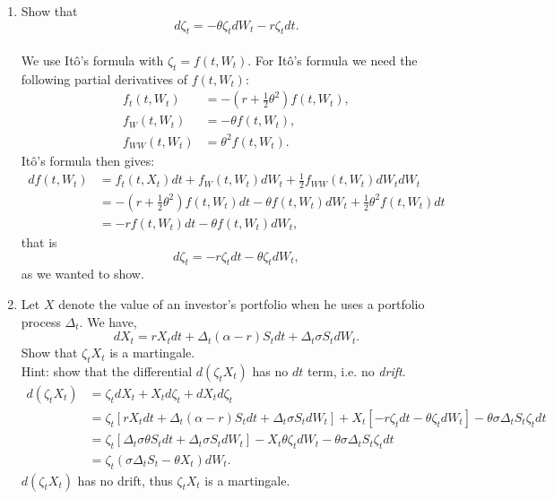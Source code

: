 \documentclass[11pt,a4,table]{article}
\begin{document}
\begin{enumerate}
    \begin{enumerate}
        \item Show that
        \begin{equation*}
            d\zeta_t = -\theta \zeta_t dW_t - r\zeta_t dt.
        \end{equation*}\\
        We use Itô's formula with $\zeta_t=f(t,W_t)$. For Itô's formula we need the following partial derivatives of $f(t,W_t)$:
        \begin{align*}
            f_t(t,W_t) &= -\left(r+\frac{1}{2}\theta^2\right) f(t,W_t),\\
            f_W(t,W_t) &= -\theta f(t,W_t),\\
            f_{WW}(t,W_t) &= \theta^2 f(t,W_t).
        \end{align*}
        Itô's formula then gives:
        \begin{align*}
            df(t,W_t) &= f_t(t,X_t) dt + f_W(t,W_t) dW_t + \frac{1}{2}f_{WW}(t,W_t) dW_tdW_t\\
            &= - \left(r + \frac{1}{2}\theta^2\right) f(t,W_t) dt - \theta f(t,W_t) dW_t + \frac{1}{2}\theta^2 f(t,W_t) dt\\
            &= -rf(t,W_t) dt - \theta f(t,W_t) dW_t,
        \end{align*}
        that is
        \begin{equation*}
            d\zeta_t = -r\zeta_t dt -\theta\zeta_t dW_t,
        \end{equation*}
        as we wanted to show.
        
        \item Let $X$ denote the value of an investor's portfolio when he uses a portfolio process $\Delta_t$. We have,
        \begin{equation*}
            dX_t= rX_t dt + \Delta_t(\alpha -r) S_t dt + \Delta_t \sigma S_t dW_t.
        \end{equation*}
        Show that $\zeta_t X_t$ is a martingale.\\
        Hint: show that the differential $d(\zeta_t X_t)$ has no $dt$ term, i.e. no \textit{drift}.\\
        \begin{align*}
            d(\zeta_t X_t) &= \zeta_t dX_t + X_t d\zeta_t + dX_td\zeta_t\\
            &= \zeta_t[rX_t dt + \Delta_t(\alpha -r)S_t dt + \Delta_t\sigma S_t dW_t] + X_t [-r\zeta_t dt - \theta\zeta_t dW_t] -\theta \sigma \Delta_t S_t \zeta_t dt\\
            &= \zeta_t[\Delta_t\sigma\theta S_t dt + \Delta_t\sigma S_t dW_t] - X_t\theta\zeta_t dW_t -\theta\sigma\Delta_t S_t\zeta_t dt\\
            &= \zeta_t(\sigma\Delta_t S_t - \theta X_t) dW_t.
        \end{align*}
        $d(\zeta_t X_t)$ has no drift, thus $\zeta_tX_t$ is a martingale.
        

\end{enumerate}
\end{enumerate}
\end{document}
